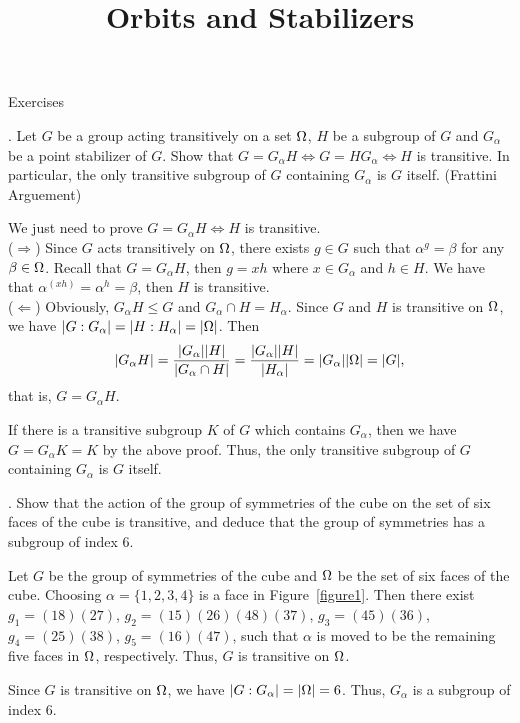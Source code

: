 \documentclass[12pt]{amsart}
\def\iif{\Leftrightarrow} \def\Rto{\Rightarrow} \def\Lto{\Leftarrow}
\def\a{\alpha} \def\b{\beta} \def\g{\gamma} \def\d{\delta} \def\e{\varepsilon}
\def\m{\medskip} \def\l{\noindent} \def\x{$\!\,$} \def\J{$-\!\,$}
\def\pf{\noindent {\it Proof.\ }}
\begin{document}
\title[Orbits and Stabilizers]
{Orbits and Stabilizers}%
\maketitle

\l Exercises

\l 1. Let $G$ be a group acting transitively on a set $\Omega$, $H$ be a subgroup of $G$ and $G_{\a}$ be a point stabilizer of $G$. Show that $G=G_{\a}H\iif G=HG_{\a}\iif H$ is transitive. In particular, the only transitive subgroup of $G$ containing $G_{\a}$ is $G$ itself. (Frattini Arguement)
\m

\pf We just need to prove $G=G_{\a}H\iif H$ is transitive. \\
($\Rto$) Since $G$ acts transitively on $\Omega$, there exists $g\in G$ such that ${\a}^g=\b$ for any $\b\in \O$.
Recall that $G=G_{\a}H$, then $g=xh$ where $x\in G_{\a}$ and $h\in H$.
We have that ${\a}^(xh)={\a}^h=\b$, then $H$ is transitive.\\
($\Lto$) Obviously, $G_{\a}H\le G$ and $G_{\a}\cap H=H_{\a}$.
Since $G$ and $H$ is transitive on $\Omega$, we have $|G:G_{\a}|=|H:H_{\a}|=|\O|$.
Then
\begin{align*}
 |G_{\a}H|=\frac{|G_{\a}||H|}{|G_{\a}\cap H|}=\frac{|G_{\a}||H|}{|H_{\a}|}=|G_{\a}||\O|=|G|,
\end{align*}
that is, $G=G_{\a}H$.

If there is a transitive subgroup $K$ of $G$ which contains $G_{\a}$, then we have $G=G_{\a}K=K$ by the above proof.
Thus, the only transitive subgroup of $G$ containing $G_{\a}$ is $G$ itself.

\m
\m

\l 2. Show that the action of the group of symmetries of the cube on the set of six faces of the cube is transitive, and deduce that the group of symmetries has a subgroup of index 6.
\m

\pf Let $G$ be the group of symmetries of the cube and $\Omega$ be the set of six faces of the cube.
Choosing $\a=\{1,2,3,4\}$ is a face in Figure~\ref{figure1}.
Then there exist $g_1=(18)(27)$, $g_2=(15)(26)(48)(37)$, $g_3=(45)(36)$, $g_4=(25)(38)$, $g_5=(16)(47)$, such that $\a$ is moved to be the remaining five faces in $\Omega$, respectively.
Thus, $G$ is transitive on $\Omega$.

Since $G$ is transitive on $\Omega$, we have $|G:G_{\a}|=|\O|=6$. 
Thus, $G_{\a}$ is a subgroup of index 6.
\end{document}
